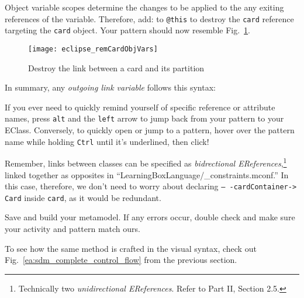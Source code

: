 \begin{itemize}
\itemWithRightTriangle Object variable scopes determine the changes to be applied to the any exiting references of the variable. Therefore, add:
 to \texttt{@this} to destroy the \texttt{card} reference targeting the \texttt{card} object. Your pattern should now resemble
Fig.~\ref{eclipse:deleteReference}. 

\begin{figure}[htp]
\begin{center}
    \texttt{[image: eclipse\_remCardObjVars]}
  \caption{Destroy the link between a card and its partition}
  \label{eclipse:deleteReference}
\end{center}
\end{figure}
\newpage

\itemWithRightTriangle In summary, any \emph{outgoing link
 variable} follows this syntax:


\itemWithRightTriangle If you ever need to quickly remind yourself of specific reference or attribute names, press \texttt{alt} and the \texttt{left}
arrow to jump back from your pattern to your EClass. Conversely, to quickly open
or jump to a pattern, hover over the pattern name while holding \texttt{Ctrl}
until it's underlined, then click!

\itemWithRightTriangle Remember, links between classes can be specified as \emph{bidrectional EReferences},\footnote{Technically two
\emph{unidirectional EReferences}. Refer to Part II, Section 2.5.} linked together as opposites in ``LearningBoxLanguage/\_con\-straints.mconf.'' In this case,
therefore, we don't need to worry about declaring \texttt{--
-cardContainer-> Card} inside \texttt{card}, as it would be redundant.

\itemWithRightTriangle Save and build your metamodel. If any errors occur, double check and make sure your activity and pattern match ours. 

\itemWithRightTriangle To see how the same method is crafted in the visual syntax, check out Fig.~\ref{ea:sdm_complete_control_flow} from the previous
section.

\end{itemize}
